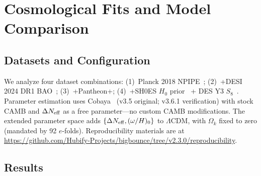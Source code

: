 \documentclass[aps,prd,twocolumn,superscriptaddress,showpacs,preprintnumbers,nofootinbib,longbibliography,floatfix]{revtex4-2}
\newcommand{\Neff}{N_{\rm eff}}
\begin{document}
\section{Cosmological Fits and Model Comparison}\label{sec:cosmo_fits}

\subsection{Datasets and Configuration}

We analyze four dataset combinations: (1)~Planck 2018 NPIPE~\cite{Planck2018params}; (2)~+DESI 2024 DR1 BAO~\cite{DESI2024}; (3)~+Pantheon+; (4)~+SH0ES $H_0$ prior~\cite{Riess2022} + DES Y3 $S_8$~\cite{DES2024}. Parameter estimation uses Cobaya~\cite{Cobaya2021} (v3.5 original; v3.6.1 verification) with stock CAMB and $\Delta\Neff$ as a free parameter---no custom CAMB modifications. The extended parameter space adds $\{\Delta\Neff, (\omega/H)_0\}$ to $\Lambda$CDM, with $\Omega_k$ fixed to zero (mandated by 92 $e$-folds). Reproducibility materials are at \url{https://github.com/Hubify-Projects/bigbounce/tree/v2.3.0/reproducibility}.\label{sec:fullcomp}

\subsection{Results}
\end{document}
